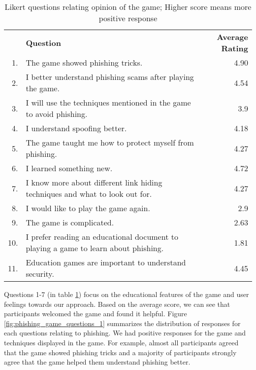\begin{table}[!ht]
    \centering
    \begin{tabular}{|r p{} r|}
        \hline
         & \textbf{Question}                                                                   & \textbf{Average Rating} \\
        1. & The game showed phishing tricks.                                                    & 4.90                    \\
        2. &I better understand phishing scams after playing the game.                          & 4.54                    \\
        3. &I will use the techniques mentioned in the game to avoid phishing.                  & 3.9                     \\
        4. &I understand spoofing better.                                                       & 4.18                    \\
        5. &The game taught me how to protect myself from phishing.                             & 4.27                    \\
        6. &I learned something new.                                                             & 4.72                    \\
        7. & I know more about different link hiding techniques and what to look out for. & 4.27 \\
        \hline
        8. &I would like to play the game again.                                                & 2.9                     \\
        9. &The game is complicated.                                                            & 2.63                    \\
        10. &I prefer reading an educational document to playing a game to learn about phishing. & 1.81                    \\
        11.& Education games are important to understand security.                              & 4.45                    \\
        \hline
    \end{tabular}
    \caption{Likert questions relating opinion of the game; Higher score means more positive response}
    \label{tab:game_questions}
\end{table}

Questions 1-7 (in table \ref{tab:game_questions}) focus on the educational features of the game and user feelings towards our approach. Based on the average score, we can see that participants welcomed the game and found it helpful. Figure \ref{fig:phishing_game_questions_1} summarizes the distribution of responses for each questions relating to phishing. We had positive responses for the game and techniques displayed in the game. For example, almost all participants agreed that the game showed phishing tricks and a majority of participants strongly agree that the game helped them understand phishing better.


